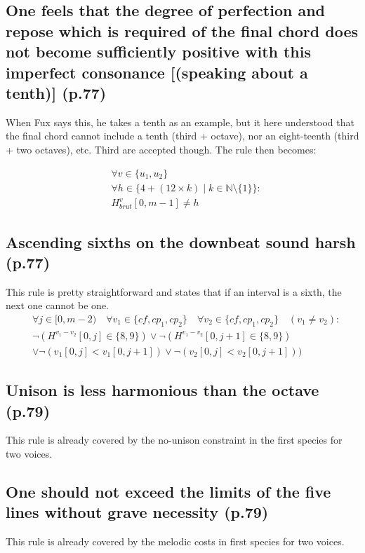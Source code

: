 \subsection{\reddot One feels that the degree of perfection and repose which is required of the final chord does not become sufficiently positive with this imperfect consonance [(speaking about a tenth)] (p.77)}
When Fux says this, he takes a tenth as an example, but it here understood that the final chord cannot include a tenth (third + octave), nor an eight-teenth (third + two octaves), etc. Third are accepted though. The rule then becomes: 

\begin{equation} \begin{aligned}
&\forall v \in \{u_1, u_2\} \quad \\
&\forall h \in \{4 + (12 \times k) \mid k \in \mathbb{N} \setminus \{1\}\} \colon \\
&H_{brut}^{v}[0, m-1] \neq h
\end{aligned} \end{equation}


\subsection{\reddot Ascending sixths on the downbeat sound harsh (p.77)}
This rule is pretty straightforward and states that if an interval is a sixth, the next one cannot be one.
\begin{equation} \begin{aligned}
&\forall j \in [0, m-2)   \quad \forall v_1 \in \{cf, cp_1, cp_2\} \quad \forall v_2 \in \{cf, cp_1, cp_2\} \quad (v_1 \neq v_2) \colon\\
&\neg (H^{v_1-v_2}[0, j] \in \{8, 9\} ) \lor \neg (H^{v_1-v_2}[0, j+1] \in \{8, 9\})\\
&\lor \neg (v_1[0,j] < v_1[0,j+1]) \lor \neg (v_2[0,j] < v_2[0,j+1]))
\end{aligned} \end{equation}


\subsection{\reddot Unison is less harmonious than the octave (p.79)}
This rule is already covered by the no-unison constraint in the first species for two voices.

\subsection{\reddot One should not exceed the limits of the five lines without grave necessity (p.79)}
This rule is already covered by the melodic costs in first species for two voices.

